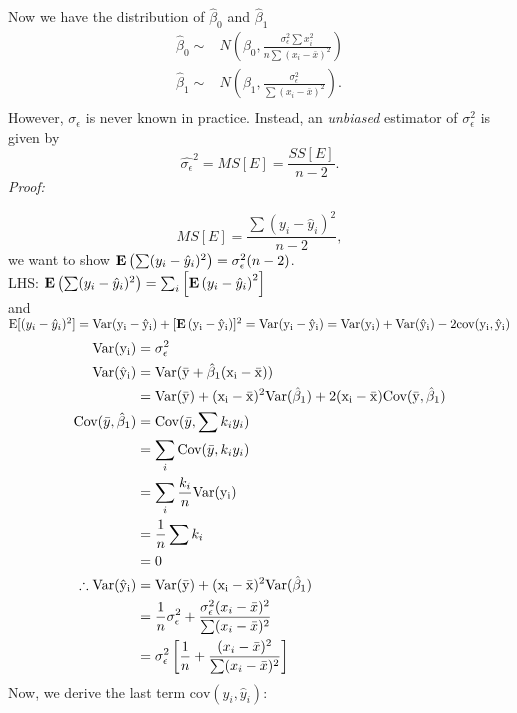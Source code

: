 Now we have the distribution of $\hat{\beta}_0$ and $\hat{\beta}_1$
  $$
  \begin{aligned}
    \hat{\beta}_0 \sim& N(\beta_0, \frac{\sigma^2_\epsilon \sum{x_i^2}}{n\sum(x_i - \bar{x})^2}) \\
    \hat{\beta}_1 \sim & N(\beta_1, \frac{\sigma^2_\epsilon}{\sum(x_i - \bar{x})^2}).\\
  \end{aligned}
  $$
%
However, $\sigma_\epsilon$ is never known in practice.  Instead, an {\it unbiased} estimator of $\sigma_\epsilon^2$ is given by
$$
\hat{\sigma_\epsilon}^2 = MS[E] = \frac{SS[E]}{n - 2}.
$$
%
{\it Proof:}\\
\begin{pf}
\begin{equation*}
MS[E] = \frac{ \sum(y_i - \hat{y}_i)^2}{n - 2},
\end{equation*}
we want to show ${\mathbf{E}\left( \sum(y_i - \hat{y}_i)^2\right)} = \sigma_\epsilon^2 (n - 2)$.\\
LHS: ${\mathbf{E}\left( \sum(y_i - \hat{y}_i)^2\right)} = \sum_i \left[ {\mathbf{E}\left(y_i - \hat{y}_i\right)}^2 \right]$\\
and $\mbox{E}[(y_i - \hat{y}_i)^2] = \rm Var(y_i - \hat{y}_i) + [{\mathbf{E}\left(y_i - \hat{y}_i\right)}]^2= \rm Var(y_i - \hat{y}_i) = \rm Var(y_i) + \rm Var(\hat{y}_i) - 2\mbox{cov}(y_i, \hat{y}_i)$
$$
\begin{aligned}
\rm Var(y_i) &= \sigma_\epsilon^2\\
\rm Var(\hat{y}_i) &= \rm Var(\bar{y} + \hat{\beta}_1 (x_i - \bar{x}))\\
&=\rm Var(\bar{y}) + (x_i - \bar{x})^2 \rm Var(\hat{\beta}_1) + 2(x_i - \bar{x}) \mbox{Cov}(\bar{y}, \hat{\beta}_1)\\
\mbox{Cov}(\bar{y}, \hat{\beta}_1) &= \mbox{Cov}(\bar{y}, \sum k_i y_i)\\
 &= \sum_i \mbox{Cov}(\bar{y}, k_i y_i) \\
&= \sum_i \frac{k_i}{n} \rm Var(y_i)\\
&= \frac{1}{n} \sum k_i\\
 &= 0\\
 \therefore \rm Var(\hat{y}_i) &= \rm Var(\bar{y}) + (x_i - \bar{x})^2 \rm Var(\hat{\beta}_1) \\
 &= \frac{1}{n} \sigma^2_\epsilon + \frac{\sigma^2_\epsilon (x_i - \bar{x})^2 }{\sum(x_i - \bar{x})^2} \\
 &= \sigma^2_\epsilon \left[ \frac{1}{n} + \frac{ (x_i - \bar{x})^2 }{\sum(x_i - \bar{x})^2} \right]
\end{aligned}
$$
Now, we derive the last term $\mbox{cov}(y_i, \hat{y}_i)$:

\end{pf}

